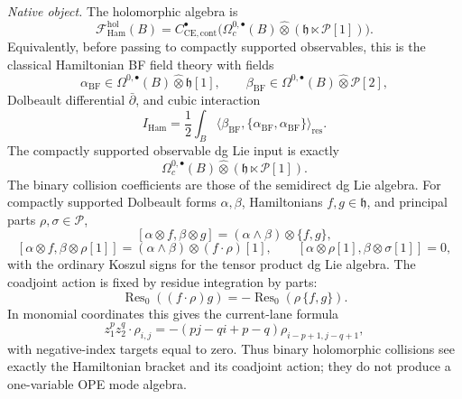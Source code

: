 \begin{stmt}
  \emph{Native object.} The holomorphic algebra is
  \[
    \mathcal F_{\mathrm{Ham}}^{\mathrm{hol}}(B)
    =
    C^\bullet_{\mathrm{CE},\mathrm{cont}}
    \bigl(
      \Omega_c^{0,\bullet}(B)\widehat\otimes
      (\mathfrak h\ltimes\mathcal P[1])
    \bigr).
  \]
  Equivalently, before passing to compactly supported observables, this is
  the classical Hamiltonian BF field theory with fields
  \[
    \alpha_{\mathrm{BF}}\in
    \Omega^{0,\bullet}(B)\widehat\otimes\mathfrak h[1],
    \qquad
    \beta_{\mathrm{BF}}\in
    \Omega^{0,\bullet}(B)\widehat\otimes\mathcal P[2],
  \]
  Dolbeault differential \(\bar\partial\), and cubic interaction
  \[
    I_{\mathrm{Ham}}
    =
    \frac12\int_B
    \langle\beta_{\mathrm{BF}},
    \{\alpha_{\mathrm{BF}},\alpha_{\mathrm{BF}}\}\rangle_{\mathrm{res}} .
  \]
  The compactly supported observable dg Lie input is exactly
  \[
    \Omega_c^{0,\bullet}(B)\widehat\otimes
    (\mathfrak h\ltimes\mathcal P[1]).
  \]
  The binary collision coefficients are those of the semidirect dg Lie
  algebra.  For compactly supported Dolbeault forms
  \(\alpha,\beta\), Hamiltonians \(f,g\in\mathfrak h\), and principal
  parts \(\rho,\sigma\in\mathcal P\),
  \[
    [\alpha\otimes f,\beta\otimes g]
      =
      (\alpha\wedge\beta)\otimes\{f,g\},
  \]
  \[
    [\alpha\otimes f,\beta\otimes\rho[1]]
      =
      (\alpha\wedge\beta)\otimes(f\cdot\rho)[1],
    \qquad
    [\alpha\otimes\rho[1],\beta\otimes\sigma[1]]=0,
  \]
  with the ordinary Koszul signs for the tensor product dg Lie algebra.
  The coadjoint action is fixed by residue integration by parts:
  \[
    \operatorname{Res}_0((f\cdot\rho)g)
      =
      -\operatorname{Res}_0(\rho\,\{f,g\}).
  \]
  In monomial coordinates this gives the current-lane formula
  \[
    z_1^p z_2^q\cdot\rho_{i,j}
    =
    -(pj-qi+p-q)\rho_{i-p+1,j-q+1},
  \]
  with negative-index targets equal to zero.  Thus binary holomorphic
  collisions see exactly the Hamiltonian bracket and its coadjoint
  action; they do not produce a one-variable OPE mode algebra.


\end{stmt}
